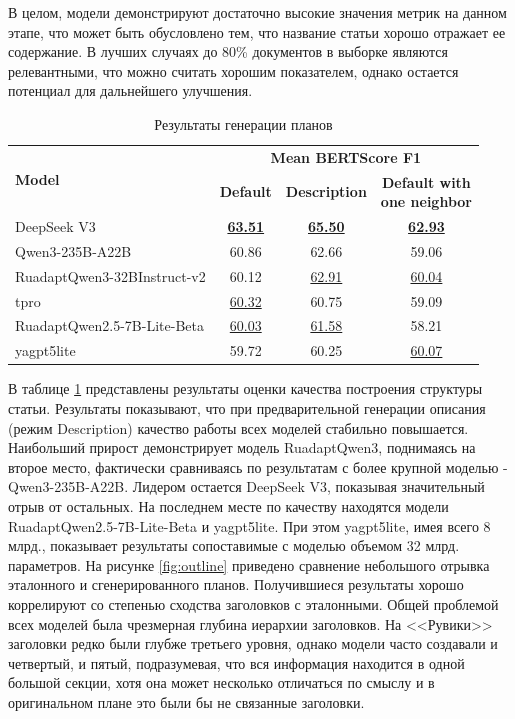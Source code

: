 \documentclass{article}
\begin{document}
В целом, модели демонстрируют достаточно высокие значения метрик на данном этапе, что может быть обусловлено тем, что название статьи хорошо отражает ее содержание. 
В лучших случаях до 80\% документов в выборке являются релевантными, что можно считать хорошим показателем, однако остается потенциал для дальнейшего улучшения.

\begin{table}[ht!]
\centering
\caption{Результаты генерации планов}
\begin{tabular}{l|c|c|c}
\hline
\multirow{2}{*}{\textbf{Model}} & \multicolumn{3}{c}{\textbf{Mean BERTScore F1}} \\
\cline{2-4}
 & \textbf{Default} & \textbf{Description} & \makecell{\textbf{Default with} \\ \textbf{one neighbor}} \\
\hline
DeepSeek V3                                         & \uline{\textbf{63.51}} & \uline{\textbf{65.50}} & \uline{\textbf{62.93}} \\
Qwen3-235B-A22B                                     & 60.86 & 62.66 & 59.06 \\
\hline
RuadaptQwen3-\allowbreak 32BInstruct-v2             & 60.12 & \uline{62.91} & \uline{60.04} \\
tpro                                                & \uline{60.32} & 60.75 & 59.09 \\
\hline
RuadaptQwen2.5-7B-\allowbreak Lite-\allowbreak Beta & \uline{60.03} & \uline{61.58} & 58.21 \\
yagpt5lite                                          & 59.72 & 60.25 & \uline{60.07} \\
\hline
\end{tabular}
\label{tab:outline_res}
\end{table}

В таблице \ref{tab:outline_res} представлены результаты оценки качества построения структуры статьи. Результаты показывают, что при предварительной генерации описания (режим Description) 
качество работы всех моделей стабильно повышается. 
Наибольший прирост демонстрирует модель RuadaptQwen3, поднимаясь на второе место, фактически сравниваясь по результатам с более крупной моделью
- Qwen3-\allowbreak 235B-\allowbreak A22B. Лидером остается DeepSeek V3, показывая значительный отрыв от остальных. На последнем месте по качеству находятся модели RuadaptQwen2.5-7B-\allowbreak Lite-\allowbreak Beta и yagpt5lite.
При этом yagpt5lite, имея всего 8 млрд., показывает результаты сопоставимые с моделью объемом 32 млрд. параметров.
На рисунке \ref{fig:outline} приведено сравнение небольшого отрывка эталонного и сгенерированного планов.
Получившиеся результаты хорошо коррелируют со степенью сходства заголовков с эталонными. Общей проблемой всех моделей была чрезмерная глубина иерархии заголовков.
На <<Рувики>> заголовки редко были глубже третьего уровня, однако модели часто создавали и четвертый, и пятый, подразумевая, что вся информация находится в одной большой секции, хотя
она может несколько отличаться по смыслу и в оригинальном плане это были бы не связанные заголовки.
\end{document}
